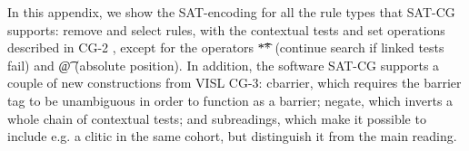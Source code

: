 \def\sobre{\text{\em sobre}}
\def\una{\text{\em una}}
\def\aproximacion{\text{ \em aproximaci\'{o}n}}
\def\mas{\text{\em m\'{a}s}}
\def\cientifica{\text{\em cient\'{\i}fica}}


\def\vPrsPThree{\text{\sc PrsP3}}
\def\vPrsPOne{\text{\sc PrsP1}}
\def\vImpPThree{\text{\sc ImpP3}}
\def\adj{{\text{\sc Adj}}}
\def\adv{{\text{\sc Adv}}}
\def\n{\text{\sc N}}
\def\pr{{\text{\sc Pr}}}
\def\prn{{\text{\sc Prn}}}
\def\det{{\text{\sc Det}}}
\def\notDet{{\neg \text{\sc Det}}}
\def\any{{\text{Any}}}


\def\sobrePr{\sobre_\pr}
\def\sobreN{\sobre_\n}

\def\unaNotDet{\una_\notDet}
\def\unaAny{\una_\any}
\def\unaPrn{\una_\prn}
\def\unaDet{\una_\det}
\def\unaPrsPThree{\una_\vPrsPThree}
\def\unaPrsPOne{\una_\vPrsPOne}
\def\unaImp{\una_\vImpPThree}
\def\aproximacionN{\aproximacion_\n}
\def\masAdv{\mas_\adv}
\def\masAdj{\mas_\adj}
\def\cientificaAdj{\cientifica_\adj}
\def\cientificaN{\cientifica_\n}


\def\newVar{\text{}} %

\def\cgrule#1{\noindent {\bf  #1 }}
\def\eqdef{\Coloneqq}
\def\impl{\quad\Longrightarrow\quad}

\def\ob#1{\overbrace{ #1 \rule{0pt}{2ex}}}







\noindent In this appendix, we show the SAT-encoding for all the rule types that 
SAT-CG supports: 
{\sc remove} and {\sc select} rules, with the contextual tests and set operations described in CG-2 \cite{tapanainen1996}, except for the operators \t{**} (continue search if linked tests fail) and \t{@} (absolute position). In addition, the software SAT-CG supports a couple of new constructions from VISL CG-3: {\sc cbarrier}, which requires the barrier tag to be unambiguous in order to function as a barrier;
{\sc negate}, which inverts a whole chain of contextual tests; and subreadings, which make it possible to include e.g. a clitic in the same cohort, but distinguish it from the main reading.


